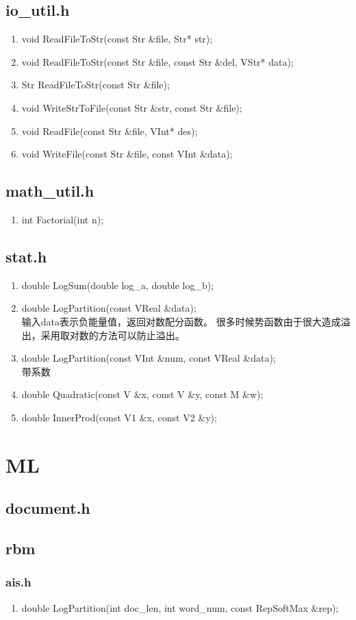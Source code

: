 \section{io\_util.h}
\begin{enumerate}
\item void ReadFileToStr(const Str \&file, Str* str);
\item void ReadFileToStr(const Str \&file, const Str \&del, VStr* data);
\item Str ReadFileToStr(const Str \&file);
\item void WriteStrToFile(const Str \&str, const Str \&file);
\item void ReadFile(const Str \&file, VInt* des);
\item void WriteFile(const Str \&file, const VInt \&data);
\end{enumerate}

\section{math\_util.h}
\begin{enumerate}
\item int Factorial(int n);
\end{enumerate}

\section{stat.h}
\begin{enumerate}
\item double LogSum(double log\_a, double log\_b);
\item double LogPartition(const VReal \&data);
\\输入data表示负能量值，返回对数配分函数。
很多时候势函数由于很大造成溢出，采用取对数的方法可以防止溢出。
\item double LogPartition(const VInt \&num, const VReal \&data);
\\带系数
\item double Quadratic(const V \&x, const V \&y, const M \&w);
\item double InnerProd(const V1 \&x, const V2 \&y);
\end{enumerate}

\chapter{ML}
\section{document.h}

\section{rbm}
\subsection{ais.h}
\begin{enumerate}
\item double LogPartition(int doc\_len, int word\_num, const RepSoftMax \&rep);
\end{enumerate}
